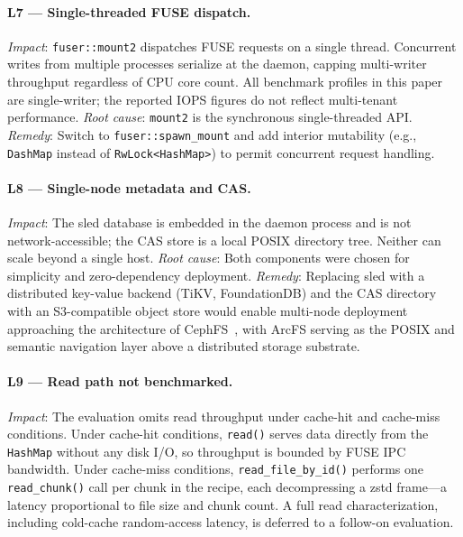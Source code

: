 \documentclass[5p,times]{elsarticle}
\begin{document}
\paragraph{L7 --- Single-threaded FUSE dispatch.}
\textit{Impact}: \texttt{fuser::mount2} dispatches FUSE requests on a
single thread.  Concurrent writes from multiple processes serialize at
the daemon, capping multi-writer throughput regardless of CPU core count.
All benchmark profiles in this paper are single-writer; the reported
IOPS figures do not reflect multi-tenant performance.  \textit{Root cause}:
\texttt{mount2} is the synchronous single-threaded API.  \textit{Remedy}:
Switch to \texttt{fuser::spawn\_mount} and add interior mutability
(e.g., \texttt{DashMap} instead of \texttt{RwLock<HashMap>}) to permit
concurrent request handling.

\paragraph{L8 --- Single-node metadata and CAS.}
\textit{Impact}: The sled database is embedded in the daemon process and
is not network-accessible; the CAS store is a local POSIX directory tree.
Neither can scale beyond a single host.  \textit{Root cause}: Both
components were chosen for simplicity and zero-dependency deployment.
\textit{Remedy}: Replacing sled with a distributed key-value backend
(TiKV, FoundationDB) and the CAS directory with an S3-compatible object
store would enable multi-node deployment approaching the architecture of
CephFS~\cite{weil2006ceph}, with ArcFS serving as the POSIX and semantic
navigation layer above a distributed storage substrate.

\paragraph{L9 --- Read path not benchmarked.}
\textit{Impact}: The evaluation omits read throughput under cache-hit and
cache-miss conditions.  Under cache-hit conditions, \texttt{read()}
serves data directly from the \texttt{HashMap} without any disk I/O,
so throughput is bounded by FUSE IPC bandwidth.  Under cache-miss
conditions, \texttt{read\_file\_by\_id()} performs one \texttt{read\_chunk()}
call per chunk in the recipe, each decompressing a zstd frame---a
latency proportional to file size and chunk count.  A full read
characterization, including cold-cache random-access latency, is deferred
to a follow-on evaluation.
\end{document}
